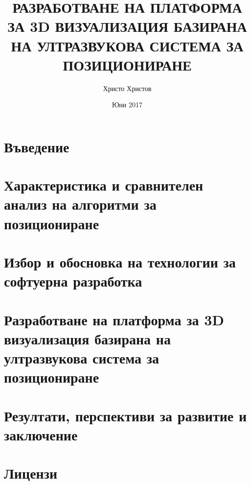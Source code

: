 \documentclass{article}
\title{РАЗРАБОТВАНЕ НА ПЛАТФОРМА ЗА 3D ВИЗУАЛИЗАЦИЯ БАЗИРАНА НА УЛТРАЗВУКОВА СИСТЕМА ЗА ПОЗИЦИОНИРАНЕ}
\author{Христо Христов}
\date{Юни 2017}
\begin{document}
\maketitle



\pagebreak

\tableofcontents

\pagebreak
\section{Въведение}



\pagebreak
\section{Характеристика и сравнителен анализ на алгоритми за позициониране}



\pagebreak
\section{Избор и обосновка на технологии за софтуерна разработка}


\pagebreak
\section{Разработване на платформа за 3D визуализация базирана на ултразвукова система за позициониране}


\pagebreak
\section{Резултати, перспективи за развитие и заключение}


\pagebreak
\section{Лицензи}


\printbibliography
\end{document}

